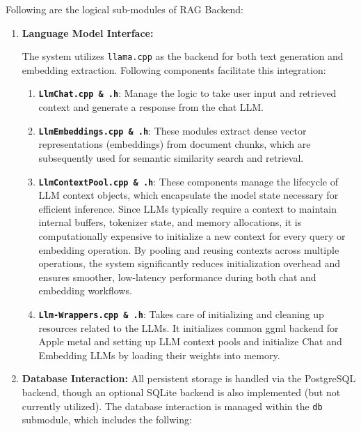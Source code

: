 Following are the logical sub-modules of RAG Backend:
\begin{enumerate}[label=\Alph*.]
\item{\textbf{Language Model Interface:}}

The system utilizes \texttt{llama.cpp} as the backend for both text generation and embedding extraction. Following components facilitate this integration:

\begin{enumerate}
    \item \textbf{\texttt{LlmChat.cpp \& .h}}: Manage the logic to take user input and retrieved context and generate a response from the chat LLM. 
    \item \textbf{\texttt{LlmEmbeddings.cpp \& .h}}: These modules extract dense vector representations (embeddings) from document chunks, which are subsequently used for semantic similarity search and retrieval.
    \item \textbf{\texttt{LlmContextPool.cpp \& .h}}: These components manage the lifecycle of LLM context objects, which encapsulate the model state necessary for efficient inference. Since LLMs typically require a context to maintain internal buffers, tokenizer state, and memory allocations, it is computationally expensive to initialize a new context for every query or embedding operation. By pooling and reusing contexts across multiple operations, the system significantly reduces initialization overhead and ensures smoother, low-latency performance during both chat and embedding workflows.
    \item \textbf{\texttt{Llm-Wrappers.cpp \& .h}}: Takes care of initializing and cleaning up resources related to the LLMs. It initializes common ggml backend for Apple metal and setting up LLM context pools and initialize Chat and Embedding LLMs by loading their weights into memory.
\end{enumerate}

\item{\textbf{Database Interaction:}}
All persistent storage is handled via the PostgreSQL backend, though an optional SQLite backend is also implemented (but not currently utilized). The database interaction is managed within the \texttt{db} submodule, which includes the follwing:


\end{enumerate}
